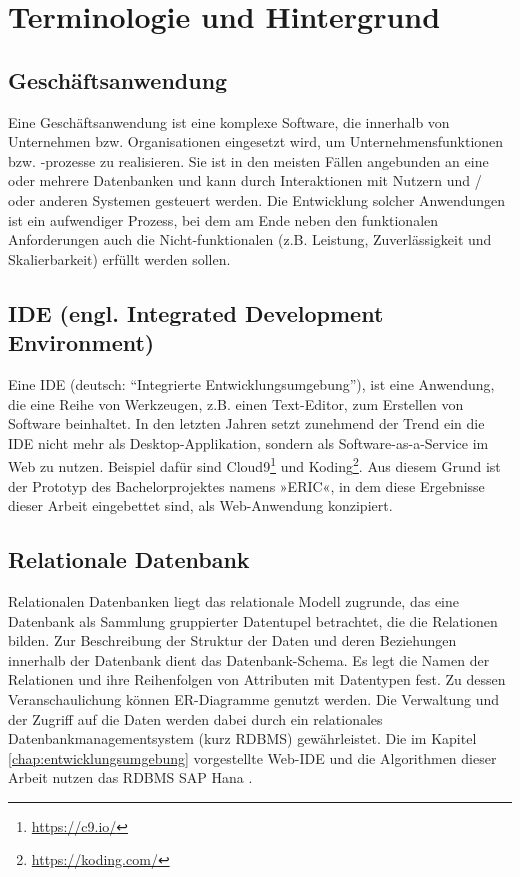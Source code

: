 \section{Terminologie und Hintergrund}\label{chap:terminology}

%
%

\subsection{Geschäftsanwendung}
Eine Geschäftsanwendung ist eine komplexe Software, die innerhalb von Unternehmen bzw. Organisationen eingesetzt wird, um Unternehmensfunktionen bzw. -prozesse zu realisieren.
Sie ist in den meisten Fällen angebunden an eine oder mehrere Datenbanken und kann durch Interaktionen mit Nutzern und / oder anderen Systemen gesteuert werden.
Die Entwicklung solcher Anwendungen ist ein aufwendiger Prozess, bei dem am Ende neben den funktionalen Anforderungen auch die Nicht-funktionalen (z.B. Leistung, Zuverlässigkeit und Skalierbarkeit) erfüllt werden sollen.

\subsection{IDE (engl. Integrated Development Environment)}
Eine IDE (deutsch: ``Integrierte Entwicklungsumgebung''), ist eine Anwendung, die eine Reihe von Werkzeugen, z.B. einen Text-Editor, zum Erstellen von Software beinhaltet.
In den letzten Jahren setzt zunehmend der Trend ein die IDE nicht mehr als Desktop-Applikation, sondern als Software-as-a-Service \cite{SIIA} im Web zu nutzen.
Beispiel dafür sind Cloud9\footnote{\url{https://c9.io/}} und Koding\footnote{\url{https://koding.com/}}.
Aus diesem Grund ist der Prototyp des Bachelorprojektes namens »ERIC«, in dem diese Ergebnisse dieser Arbeit eingebettet sind, als Web-Anwendung konzipiert.

\subsection{Relationale Datenbank}
Relationalen Datenbanken liegt das relationale Modell \cite{Codd:1970:RMD:362384.362685} zugrunde, das eine Datenbank als Sammlung gruppierter Datentupel betrachtet, die die Relationen bilden.
Zur Beschreibung der Struktur der Daten und deren Beziehungen innerhalb der Datenbank dient das Datenbank-Schema.
Es legt die Namen der Relationen und ihre Reihenfolgen von Attributen mit Datentypen fest.
Zu dessen Veranschaulichung können ER-Diagramme \cite{Chen:1976:EMU:320434.320440} genutzt werden.
Die Verwaltung und der Zugriff auf die Daten werden dabei durch ein relationales Datenbankmanagementsystem (kurz RDBMS) gewährleistet.
Die im Kapitel \ref{chap:entwicklungsumgebung} vorgestellte Web-IDE und die Algorithmen dieser Arbeit nutzen das RDBMS SAP Hana \cite{DBLP:dblp_journals/sigmod/FarberCPBSL11}.

